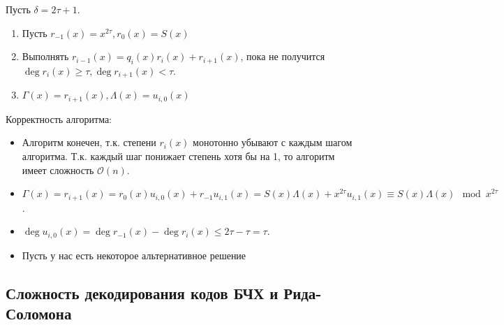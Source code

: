 Пусть \(\delta = 2\tau + 1\).
\begin{enumerate}
    \item Пусть \(r_{ - 1}(x) = x^{2\tau}, r_0(x) = S(x)\)
    \item Выполнять \(r_{i-1}(x) = q_i(x)r_i(x) + r_{i+1}(x)\), пока не получится \(\deg r_i(x) \geq \tau, \deg r_{i+1}(x) < \tau\).
    \item \(\Gamma(x) = r_{i+1}(x), \Lambda(x) = u_{i,0}(x)\)
\end{enumerate}
Корректность алгоритма:
\begin{itemize}
    \item Алгоритм конечен, т.к. степени \(r_i(x)\) монотонно убывают с каждым
    шагом алгоритма. Т.к. каждый шаг понижает степень хотя бы на 1, то алгоритм
    имеет сложность \(\mathcal{O}(n)\).
    \item \(\Gamma(x) = r_{i+1}(x) = r_0(x)u_{i,0}(x) + r_{-1}u_{i,1}(x)
    = S(x)\Lambda(x) + x^{2\tau} u_{i,1}(x) \equiv S(x)\Lambda(x) \mod x^{2\tau}\).
    \item \(\deg u_{i,0}(x) = \deg r_{ - 1}(x) - \deg r_i(x)
    \leq 2\tau - \tau = \tau\). 
    \item Пусть у нас есть некоторое альтернативное решение \unfinished
\end{itemize}

\subsection{Сложность декодирования кодов БЧХ и Рида-Соломона}

